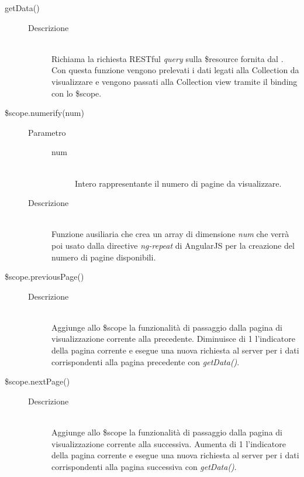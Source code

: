 \begin{description}
\begin{description}
  \item[getData()] \hfill 
  \begin{description}
  		\item[Descrizione] \hfill \\
  Richiama la richiesta RESTful \textit{query} sulla \$resource fornita dal .
  Con questa funzione vengono prelevati i dati legati alla Collection da visualizzare e vengono
  passati alla Collection view tramite il binding con lo \$scope. 
  
  \end{description}
  
  \item[\$scope.numerify(num)] \hfill 
  \begin{description}
  	\item[Parametro] \hfill
  	\begin{description}
  		\item[num] \hfill \\
  		Intero rappresentante il numero di pagine da visualizzare.
	\end{description}  		
  	\item[Descrizione] \hfill \\
  Funzione ausiliaria che crea un array di dimensione \textit{num} che verrà poi usato dalla directive \textit{ng-repeat} di AngularJS per la creazione del numero di pagine disponibili.
  \end{description}
  
  \item[\$scope.previousPage()] \hfill 
  \begin{description}
  		\item[Descrizione] \hfill \\
  Aggiunge allo \$scope la funzionalità di passaggio dalla pagina di visualizzazione corrente alla precedente. Diminuisce di 1 l'indicatore della pagina corrente e esegue una nuova richiesta al server per i dati corrispondenti alla pagina precedente con \textit{getData()}.
  \end{description}
  
  \item[\$scope.nextPage()] \hfill
  \begin{description}
  		\item[Descrizione] \hfill \\
  Aggiunge allo \$scope la funzionalità di passaggio dalla pagina di visualizzazione corrente alla successiva. Aumenta di 1 l'indicatore della pagina corrente e esegue una nuova richiesta al server per i dati corrispondenti alla pagina successiva con \textit{getData()}.
  \end{description}
  

\end{description}
\end{description}
